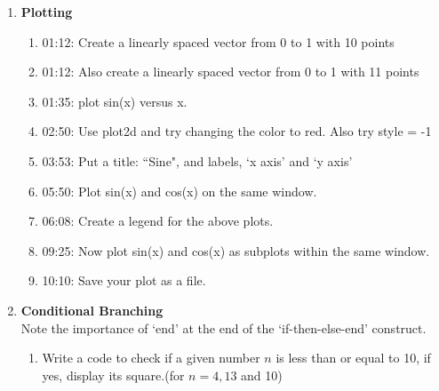 \documentclass[12pt,a4paper]{article}
\newenvironment{enumcpt}{\begin{enumerate} \topsep -3mm \partopsep -3mm 
                        \parsep -3mm
                        \itemsep -0mm \leftmargin -1in \rightmargin -3mm
                        }{\end{enumerate}}
\begin{document}
\begin{multicols}{2}
\begin{enumcpt}
\item {\bf Plotting}
\begin{enumcpt}
\item 01:12: Create a linearly spaced vector from 0 to 1 with 10 points
\item 01:12: Also create a linearly spaced vector from 0 to 1 with 11 points
\item 01:35: plot sin(x) versus x.
\item 02:50: Use plot2d and try changing the color to red. Also try style = -1
\item 03:53: Put a title: ``Sine", and labels, `x axis' and `y axis'
\item 05:50: Plot sin(x) and cos(x) on the same window. 
\item 06:08: Create a legend for the above plots.
\item 09:25: Now plot sin(x) and cos(x) as subplots within the same window.
\item 10:10: Save your plot as a file.

\end{enumcpt}

\item {\bf Conditional Branching}\\
Note the importance of `end' at the end of the `if-then-else-end' construct. 
\begin{enumcpt}
\item  Write a code to check if a given number $n$ is less than or
equal to 10, if yes, display its square.(for $n= 4, 13$ and 10)
 

\end{enumcpt}
\end{enumcpt}
\end{multicols}
\end{document}
